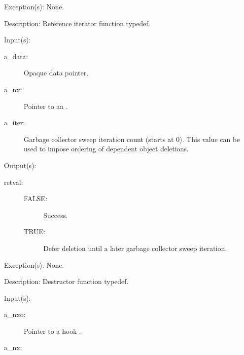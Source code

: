 \begin{capi}
\begin{capilist}
	\item[Exception(s): ] None.
	\item[Description: ]
		Reference iterator function typedef.
	\end{capilist}
\label{cw_nxo_hook_delete_t}
	\begin{capilist}
	\item[Input(s): ]
		\begin{description}\item[]
		\item[a\_data: ]
			Opaque data pointer.
		\item[a\_nx: ]
			Pointer to an .
		\item[a\_iter: ]
			Garbage collector sweep iteration count (starts at 0).
			This value can be used to impose ordering of dependent
			object deletions.
		\end{description}
	\item[Output(s): ]
		\begin{description}\item[]
		\item[retval: ]
			\begin{description}\item[]
			\item[FALSE: ] Success.
			\item[TRUE: ] Defer deletion until a later garbage
			collector sweep iteration.
			\end{description}
		\end{description}
	\item[Exception(s): ] None.
	\item[Description: ]
		Destructor function typedef.
	\end{capilist}
\label{nxo_hook_new}
	\begin{capilist}
	\item[Input(s): ]
		\begin{description}\item[]
		\item[a\_nxo: ]
			Pointer to a hook \classname{nxo}.
		\item[a\_nx: ]

\end{description}
\end{capilist}
\end{capi}
